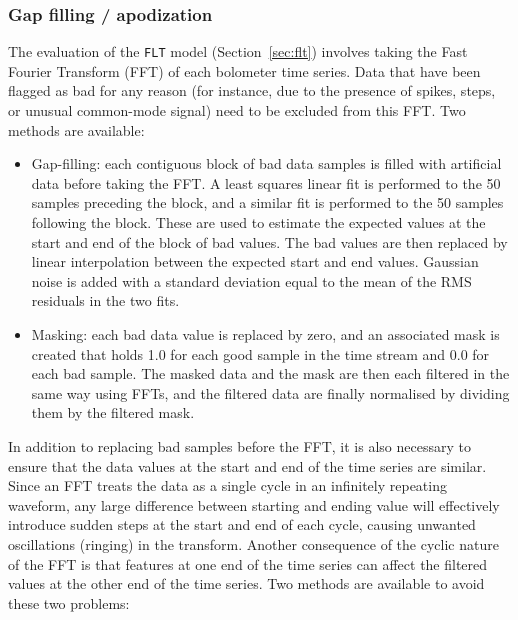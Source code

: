\documentclass[useAMS,usenatbib,nofootinbib]{mn2e}
\newcommand{\model}[1]{\texttt{#1}}
\begin{document}
\subsubsection{Gap filling / apodization}
\label{sec:gaps}

The evaluation of the \model{FLT} model (Section~\ref{sec:flt})
involves taking the Fast Fourier Transform (FFT) of each bolometer
time series. Data that have been flagged as bad for any reason (for
instance, due to the presence of spikes, steps, or unusual common-mode
signal) need to be excluded from this FFT. Two methods are available:

\begin{itemize}
\item Gap-filling: each contiguous block of bad data samples is filled
with artificial data before taking the FFT. A least squares linear fit is
performed to the 50 samples preceding the block, and a similar fit is
performed to the 50 samples following the block. These are used to
estimate the expected values at the start and end of the block of bad
values. The bad values are then replaced by linear interpolation between
the expected start and end values. Gaussian noise is added with a
standard deviation equal to the mean of the RMS residuals in the two
fits.

\item Masking: each bad data value is replaced by zero, and an
associated mask is created that holds 1.0 for each good sample in the
time stream and 0.0 for each bad sample. The masked data and the mask
are then each filtered in the same way using FFTs, and the filtered
data are finally normalised by dividing them by the filtered mask.
\end{itemize}

In addition to replacing bad samples before the FFT, it is also
necessary to ensure that the data values at the start and end of the
time series are similar. Since an FFT treats the data as a single
cycle in an infinitely repeating waveform, any large difference
between starting and ending value will effectively introduce sudden
steps at the start and end of each cycle, causing unwanted
oscillations (ringing) in the transform. Another consequence of the
cyclic nature of the FFT is that features at one end of the time
series can affect the filtered values at the other end of the time
series. Two methods are available to avoid these two problems:
\end{document}
